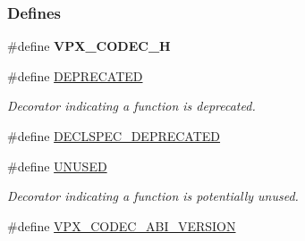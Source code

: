 \subsubsection*{\-Defines}
\begin{DoxyCompactItemize}
\item 
\hypertarget{group__codec_ga148a1b7418b30ecd9abb3413782aecd1}{
\#define {\bfseries \-V\-P\-X\-\_\-\-C\-O\-D\-E\-C\-\_\-\-H}}
\label{group__codec_ga148a1b7418b30ecd9abb3413782aecd1}

\item 
\hypertarget{group__codec_gac1e8a42306d8e67cb94ca31c3956ee78}{
\#define \hyperlink{group__codec_gac1e8a42306d8e67cb94ca31c3956ee78}{\-D\-E\-P\-R\-E\-C\-A\-T\-E\-D}}
\label{group__codec_gac1e8a42306d8e67cb94ca31c3956ee78}

\begin{DoxyCompactList}\small\item\em \-Decorator indicating a function is deprecated. \end{DoxyCompactList}\item 
\#define \hyperlink{group__codec_gab61b56b074706ee8423d864b511212ad}{\-D\-E\-C\-L\-S\-P\-E\-C\-\_\-\-D\-E\-P\-R\-E\-C\-A\-T\-E\-D}
\item 
\hypertarget{group__codec_gaddf5ec070e9499d36b7f2009ce736076}{
\#define \hyperlink{group__codec_gaddf5ec070e9499d36b7f2009ce736076}{\-U\-N\-U\-S\-E\-D}}
\label{group__codec_gaddf5ec070e9499d36b7f2009ce736076}

\begin{DoxyCompactList}\small\item\em \-Decorator indicating a function is potentially unused. \end{DoxyCompactList}\item 
\hypertarget{group__codec_gaf7e9cad2df0f81679b881f46740ad097}{
\#define \hyperlink{group__codec_gaf7e9cad2df0f81679b881f46740ad097}{\-V\-P\-X\-\_\-\-C\-O\-D\-E\-C\-\_\-\-A\-B\-I\-\_\-\-V\-E\-R\-S\-I\-O\-N}}
\label{group__codec_gaf7e9cad2df0f81679b881f46740ad097}


\end{DoxyCompactItemize}
